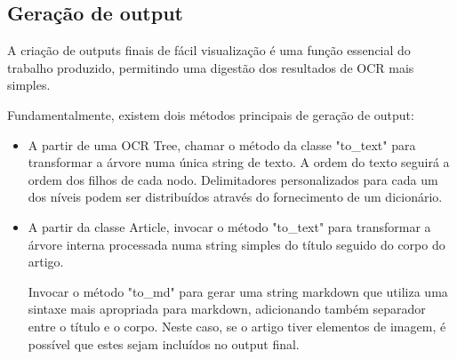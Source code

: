 \subsection{Geração de output}

A criação de outputs finais de fácil visualização é uma função essencial do trabalho produzido, permitindo uma digestão dos resultados de OCR mais simples.

Fundamentalmente, existem dois métodos principais de geração de output:

\begin{itemize}\setlength\itemsep{-0.3em}
	\vspace{-0.5em}
	\item A partir de uma OCR Tree, chamar o método da classe "to\_text" para transformar a árvore numa única string de texto. A ordem do texto seguirá a ordem dos filhos de cada nodo. Delimitadores personalizados para cada um dos níveis podem ser distribuídos através do fornecimento de um dicionário.
	\item A partir da classe Article, invocar o método "to\_text" para transformar a árvore interna processada numa string simples do título seguido do corpo do artigo. 
	
	Invocar o método "to\_md" para gerar uma string markdown que utiliza uma sintaxe mais apropriada para markdown, adicionando também separador entre o título e o corpo. Neste caso, se o artigo tiver elementos de imagem, é possível que estes sejam incluídos no output final.
\end{itemize}






